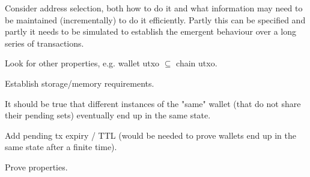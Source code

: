 \documentclass{article}
\begin{document}
Consider address selection, both how to do it and what information may need to
be maintained (incrementally) to do it efficiently. Partly this can be specified
and partly it needs to be simulated to establish the emergent behaviour over a
long series of transactions.

Look for other properties, e.g. wallet utxo $\subseteq$ chain utxo.

Establish storage/memory requirements.

It should be true that different instances of the "same" wallet (that do not share their pending sets) eventually end up in the same state.

Add pending tx expiry / TTL (would be needed to prove wallets end up in the same state after a finite time).

Prove properties.



\end{document}
